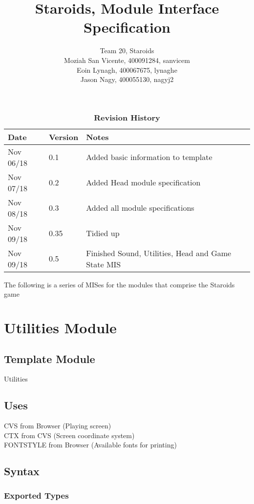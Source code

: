 \documentclass[12pt]{article}
\title{Staroids, Module Interface Specification}
\author{Team 20, Staroids
  \\ Moziah San Vicente, 400091284, sanvicem
  \\ Eoin Lynagh, 400067675, lynaghe
  \\ Jason Nagy, 400055130, nagyj2
}
\begin{document}
\maketitle

\begin{table}[bp]
\caption{\bf Revision History}
\begin{tabularx}{\textwidth}{p{3cm}p{2cm}X}
\toprule {\bf Date} & {\bf Version} & {\bf Notes}\\
\midrule
Nov 06/18 & 0.1 & Added basic information to template\\
Nov 07/18 & 0.2 & Added Head module specification\\
Nov 08/18 & 0.3 & Added all module specifications\\
Nov 09/18 & 0.35 & Tidied up\\
Nov 09/18 & 0.5 & Finished Sound, Utilities, Head and Game State MIS\\
\bottomrule
\end{tabularx}
\end{table}

The following is a series of MISes for the modules that comprise the Staroids game

\newpage

\section*{Utilities Module}

\subsection*{Template Module}

Utilities

\subsection*{Uses}

CVS from Browser (Playing screen)\\
CTX from CVS (Screen coordinate system)\\
FONTSTYLE from Browser (Available fonts for printing)\\

\subsection*{Syntax}

\subsubsection*{Exported Types}
\end{document}
